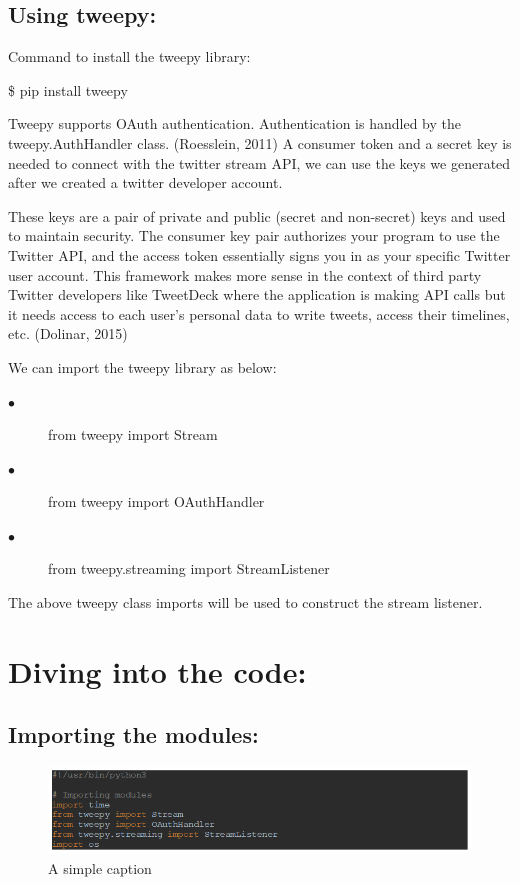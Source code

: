 \subsection{Using tweepy:}

Command to install the tweepy library:

\$ pip install tweepy

Tweepy supports OAuth authentication. Authentication is handled by the tweepy.AuthHandler class. (Roesslein, 2011)
A consumer token and a secret key is needed to connect with the twitter stream API, we can use the keys we generated after we created a twitter developer account.

These keys are a pair of private and public (secret and non-secret) keys and used to maintain security. The consumer key pair authorizes your program to use the Twitter API, and the access token essentially signs you in as your specific Twitter user account. This framework makes more sense in the context of third party Twitter developers like TweetDeck where the application is making API calls but it needs access to each user's personal data to write tweets, access their timelines, etc. (Dolinar, 2015)

We can import the tweepy library as below:

\begin{description}
\item[$\bullet$]from tweepy import Stream

\item[$\bullet$]from tweepy import OAuthHandler

\item[$\bullet$]from tweepy.streaming import StreamListener
\end{description}

The above tweepy class imports will be used to construct the stream listener.


\section{Diving into the code:}

\subsection{Importing the modules:}

\begin{figure}[ht!]
	\centering
	\includegraphics[width=150mm]{code1.png}
	\caption{A simple caption \label{overflow}}
\end{figure}

